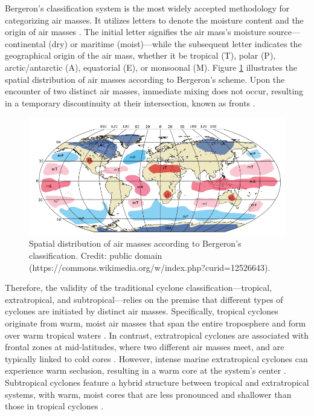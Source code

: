 Bergeron's classification system is the most widely accepted methodology for categorizing air masses. It utilizes letters to denote the moisture content and the origin of air masses \citep{spiridonov2021fundamentals}. The initial letter signifies the air mass's moisture source—continental (dry) or maritime (moist)—while the subsequent letter indicates the geographical origin of the air mass, whether it be tropical (T), polar (P), arctic/antarctic (A), equatorial (E), or monsoonal (M). Figure \ref{massas_Bergeron} illustrates the spatial distribution of air masses according to Bergeron's scheme. Upon the encounter of two distinct air masses, immediate mixing does not occur, resulting in a temporary discontinuity at their intersection, known as fronts \citep{spiridonov2021fundamentals,donald2015meteorology}.

\begin{figure}[h]
\begin{center}
\setcaptionmargin{1cm}
\includegraphics[width=0.7\columnwidth,angle=0]{fig/Air_masses.svg.png}
\caption[Air masses]{Spatial distribution of air masses according to Bergeron's classification. Credit: public domain (https://commons.wikimedia.org/w/index.php?curid=12526643).} 
\label{massas_Bergeron}
\end{center}
\end{figure}

Therefore, the validity of the traditional cyclone classification—tropical, extratropical, and subtropical—relies on the premise that different types of cyclones are initiated by distinct air masses. Specifically, tropical cyclones originate from warm, moist air masses that span the entire troposphere and form over warm tropical waters \citep{gray1968global, frank1977structurea, ramage1959hurricane, riehl1948formation}. In contrast, extratropical cyclones are associated with frontal zones at mid-latitudes, where two different air masses meet, and are typically linked to cold cores \citep{bjerknes1944theory, shapiro1990fronts,hart2003cyclone}. However, intense marine extratropical cyclones can experience warm seclusion, resulting in a warm core at the system's center \citep{hart2003cyclone,shapiro1990fronts}. Subtropical cyclones feature a hybrid structure between tropical and extratropical systems, with warm, moist cores that are less pronounced and shallower than those in tropical cyclones \citep{hart2003cyclone}.

